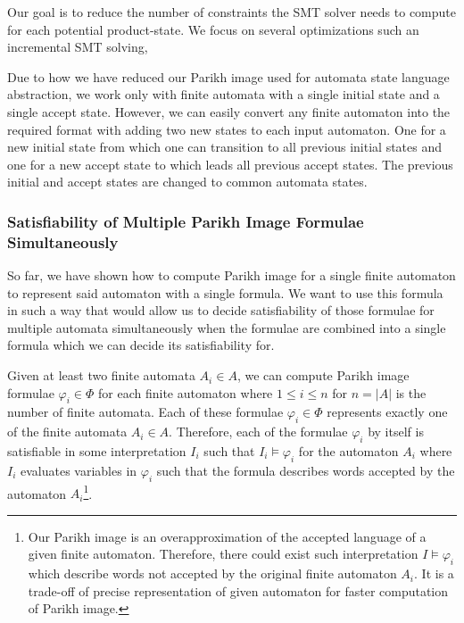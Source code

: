 
Our goal is to reduce the number of constraints the SMT solver needs to compute for each potential product-state. We focus on several optimizations such an incremental SMT solving,

Due to how we have reduced our Parikh image used for automata state language abstraction, we work only with finite automata with a single initial state and a single accept state. However, we can easily convert any finite automaton into the required format with adding two new states to each input automaton. One for a new initial state from which one can transition to all previous initial states and one for a new accept state to which leads all previous accept states. The previous initial and accept states are changed to common automata states.




\subsubsection{Satisfiability of Multiple Parikh Image Formulae Simultaneously}

So far, we have shown how to compute Parikh image for a single finite automaton to represent said automaton with a single formula. We want to use this formula in such a way that would allow us to decide satisfiability of those formulae for multiple automata simultaneously when the formulae are combined into a single formula which we can decide its satisfiability for.

Given at least two finite automata $A_i \in A$, we can compute Parikh image formulae $\varphi_i \in \Phi$ for each finite automaton where $1 \leq i \leq n$ for $n = |A|$ is the number of finite automata. Each of these formulae $\varphi_i \in \Phi$ represents exactly one of the finite automata $A_i \in A$. Therefore, each of the formulae $\varphi_i$ by itself is satisfiable in some interpretation $I_i$ such that $I_i \models \varphi_i$ for the automaton $A_i$ where $I_i$ evaluates variables in $\varphi_i$ such that the formula describes words accepted by the automaton $A_i$\footnote{Our Parikh image is an overapproximation of the accepted language of a given finite automaton. Therefore, there could exist such interpretation $I \models \varphi_i$ which describe words not accepted by the original finite automaton $A_i$. It is a trade-off of precise representation of given automaton  for faster computation of Parikh image.}.

